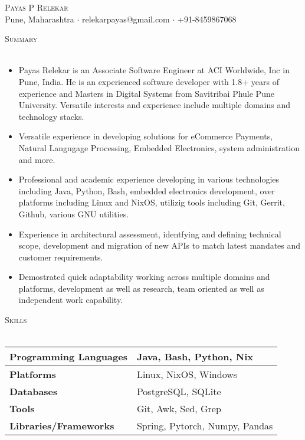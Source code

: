 \documentclass[a4paper]{article}
\newcommand{\lineunder} {
    \vspace*{-8pt} \\
    \hspace*{-18pt} \hrulefill \\
}
\newcommand{\header} [1] {
    {\hspace*{-18pt}\vspace*{6pt} \textsc{#1}}
    \vspace*{-6pt} \lineunder
}
\begin{document}
\vspace*{-40pt}

\vspace*{-10pt}
\begin{center}
	{\Huge \scshape {Payas P Relekar}}\\
	Pune, Maharashtra $\cdot$ relekarpayas@gmail.com $\cdot$ +91-8459867068\\
\end{center}

\header{Summary}
\vspace{1mm}

\begin{itemize} \itemsep 1pt
  \item Payas Relekar is an Associate Software Engineer at ACI Worldwide, Inc in Pune, India. He is an experienced software developer with 1.8+ years of experience and Masters in Digital Systems from Savitribai Phule Pune University. Versatile interests and experience include multiple domains and technology stacks.
  \item Versatile experience in developing solutions for eCommerce Payments, Natural Langugage Processing, Embedded Electronics, system administration and more.
  \item Professional and academic experience developing in various technologies including Java, Python, Bash, embedded electronics development, over platforms including Linux and NixOS, utilizig tools including Git, Gerrit, Github, various GNU utilities.
  \item Experience in architectural assessment, identfying and defining technical scope, development and migration of new APIs to match latest mandates and customer requirements.
  \item Demostrated quick adaptability working across multiple domains and platforms, development as well as research, team oriented as well as independent work capability.
\end{itemize}

\header{Skills}
\vspace{1mm}
\bgroup
\def\arraystretch{1.5}
{\renewcommand{\arraystretch}{1.5}}
\begin{tabularx}{\textwidth}{ | X | X | }
  \hline
	\textbf{Programming Languages} & Java, Bash, Python, Nix        \\
  \hline
	\textbf{Platforms}             & Linux, NixOS, Windows          \\
  \hline
	\textbf{Databases}             & PostgreSQL, SQLite             \\
  \hline
	\textbf{Tools}                 & Git, Awk, Sed, Grep            \\
  \hline
	\textbf{Libraries/Frameworks}  & Spring, Pytorch, Numpy, Pandas \\
  \hline
\end{tabularx}
\egroup
\vspace{2mm}
\end{document}
